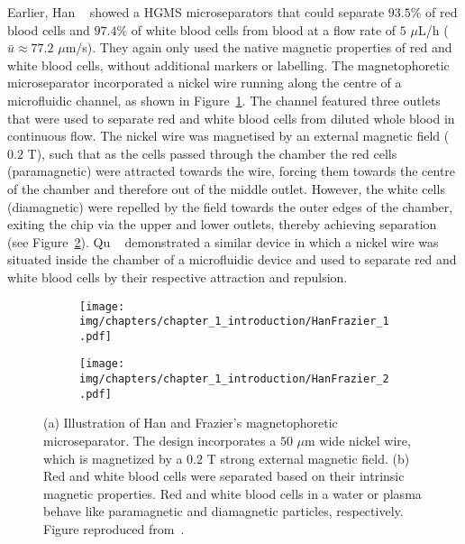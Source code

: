 Earlier, Han \etal{}~\cite{Han2006,Han2006a} showed a HGMS microseparators that could separate $93.5\%$ of red blood cells and $97.4\%$ of white blood cells from blood at a flow rate of $5$ $\mu$L/h ($\bar{u}\approx 77.2$ $\mu$m/s). They again only used the native magnetic properties of red and white blood cells, without additional markers or labelling. The magnetophoretic microseparator incorporated a nickel wire running along the centre of a microfluidic channel, as shown in Figure~\ref{fig:HanFrazier_1}. The channel featured three outlets that were used to separate red and white blood cells from diluted whole blood in continuous flow. The nickel wire was magnetised by an external magnetic field ($0.2$ T), such that as the cells passed through the chamber the red cells (paramagnetic) were attracted towards the wire, forcing them towards the centre of the chamber and therefore out of the middle outlet. However, the white cells (diamagnetic) were repelled by the field towards the outer edges of the chamber, exiting the chip via the upper and lower outlets, thereby achieving separation (see Figure~\ref{fig:HanFrazier_2}). Qu \etal{}~\cite{Qu2008} demonstrated a similar device in which a nickel wire was situated inside the chamber of a microfluidic device and used to separate red and white blood cells by their respective attraction and repulsion.

\begin{figure}[htb]
        \centering
             \begin{subfigure}[b]{0.5\textwidth}
			\texttt{[image: img/chapters/chapter\_1\_introduction/HanFrazier\_1.pdf]}
             \caption{}    
			\label{fig:HanFrazier_1}
        \end{subfigure}
        \hfill
        \begin{subfigure}[b]{0.4\textwidth}
			\texttt{[image: img/chapters/chapter\_1\_introduction/HanFrazier\_2.pdf]}
             \caption{}    
			\label{fig:HanFrazier_2}
        \end{subfigure}        
        \caption[HGMS microseparator for separating red and white blood cells]{(a) Illustration of Han and Frazier's magnetophoretic microseparator. The design incorporates a $50$ $\mu$m wide nickel wire, which is magnetized by a $0.2$ T strong external magnetic field. (b) Red and white blood cells were separated based on their intrinsic magnetic properties. Red and white blood cells in a water or plasma behave like paramagnetic and diamagnetic particles, respectively. Figure reproduced from~\cite{Han2006}.}
        \label{fig:HanFrazier}
\end{figure}

